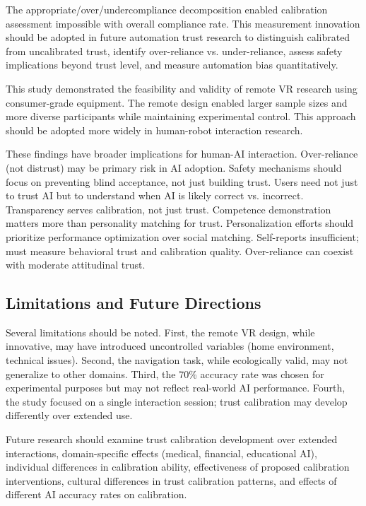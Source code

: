\documentclass[12pt]{article}
\begin{document}
The appropriate/over/undercompliance decomposition enabled calibration assessment impossible with overall compliance rate. This measurement innovation should be adopted in future automation trust research to distinguish calibrated from uncalibrated trust, identify over-reliance vs. under-reliance, assess safety implications beyond trust level, and measure automation bias quantitatively.

This study demonstrated the feasibility and validity of remote VR research using consumer-grade equipment. The remote design enabled larger sample sizes and more diverse participants while maintaining experimental control. This approach should be adopted more widely in human-robot interaction research.

These findings have broader implications for human-AI interaction. Over-reliance (not distrust) may be primary risk in AI adoption. Safety mechanisms should focus on preventing blind acceptance, not just building trust. Users need not just to trust AI but to understand when AI is likely correct vs. incorrect. Transparency serves calibration, not just trust. Competence demonstration matters more than personality matching for trust. Personalization efforts should prioritize performance optimization over social matching. Self-reports insufficient; must measure behavioral trust and calibration quality. Over-reliance can coexist with moderate attitudinal trust.

\subsection{Limitations and Future Directions}

Several limitations should be noted. First, the remote VR design, while innovative, may have introduced uncontrolled variables (home environment, technical issues). Second, the navigation task, while ecologically valid, may not generalize to other domains. Third, the 70\% accuracy rate was chosen for experimental purposes but may not reflect real-world AI performance. Fourth, the study focused on a single interaction session; trust calibration may develop differently over extended use.

Future research should examine trust calibration development over extended interactions, domain-specific effects (medical, financial, educational AI), individual differences in calibration ability, effectiveness of proposed calibration interventions, cultural differences in trust calibration patterns, and effects of different AI accuracy rates on calibration.
\end{document}
